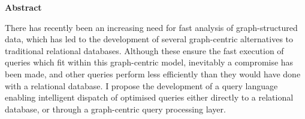 \newpage
{\Huge \bf Abstract}
\vspace{24pt} 


There has recently been an increasing need for fast analysis of
graph-structured data, which has led to the development of several
graph-centric alternatives to traditional relational databases. Although these
ensure the fast execution of queries which fit within this graph-centric model,
inevitably a compromise has been made, and other queries perform less
efficiently than they would have done with a relational database. I propose the
development of a query language enabling intelligent dispatch of optimised
queries either directly to a relational database, or through a graph-centric
query processing layer.


\newpage
\vspace*{\fill}
